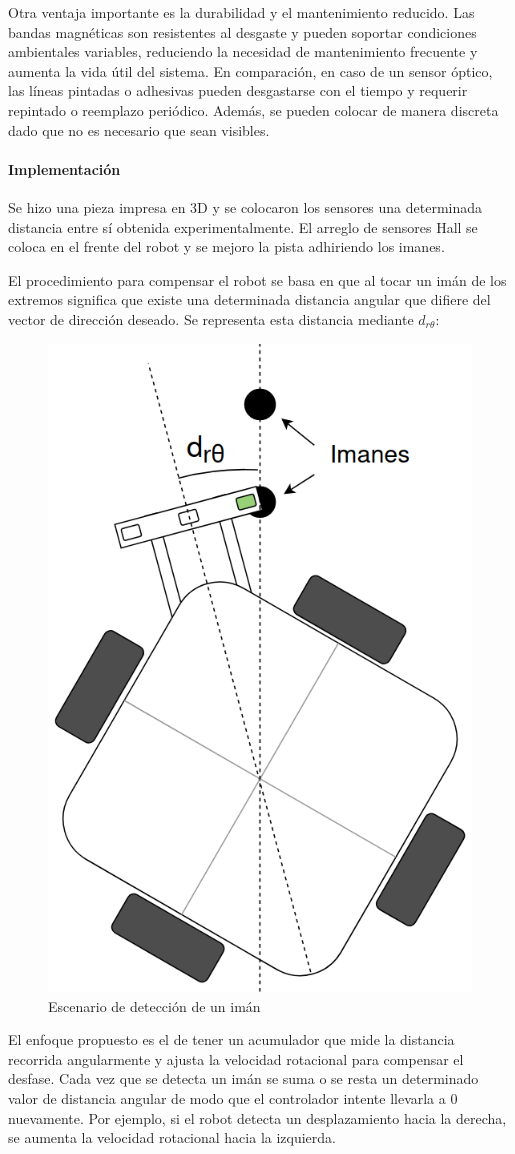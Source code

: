 Otra ventaja importante es la durabilidad y el mantenimiento reducido. Las bandas magnéticas son resistentes al desgaste y pueden soportar condiciones ambientales variables, reduciendo la necesidad de mantenimiento frecuente y aumenta la vida útil del sistema. En comparación, en caso de un sensor óptico, las líneas pintadas o adhesivas pueden desgastarse con el tiempo y requerir repintado o reemplazo periódico. Además, se pueden colocar de manera discreta dado que no es necesario que sean visibles.


\paragraph{Implementación} \mbox{} \vspace{10pt}

Se hizo una pieza impresa en 3D y se colocaron los sensores una determinada distancia entre sí obtenida experimentalmente. El arreglo de sensores Hall se coloca en el frente del robot y se mejoro la pista adhiriendo los imanes.

El procedimiento para compensar el robot se basa en que al tocar un imán de los extremos significa que existe una determinada distancia angular que difiere del vector de dirección deseado. Se representa esta distancia mediante $d_{r\theta}$:

\begin{figure}[H]
    \centering
    \includegraphics[width=0.4\linewidth]{images/robot_desplazamiento_angular_toca_iman.png}
    \caption{Escenario de detección de un imán}
    \label{fig:deteccionimanrobot}
\end{figure}

El enfoque propuesto es el de tener un acumulador que mide la distancia recorrida angularmente y ajusta la velocidad rotacional para compensar el desfase. Cada vez que se detecta un imán se suma o se resta un determinado valor de distancia angular de modo que el controlador intente llevarla a 0 nuevamente. Por ejemplo, si el robot detecta un desplazamiento hacia la derecha, se aumenta la velocidad rotacional hacia la izquierda.

